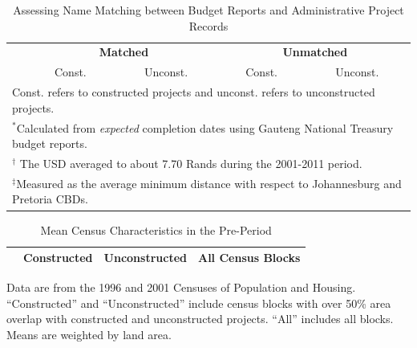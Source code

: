 \documentclass[12pt]{article}
\begin{document}
\vspace{0mm}
\begin{table}[h!]
\centering
\caption{Assessing Name Matching between Budget Reports and Administrative Project Records}\label{table:stringmatch}
\vspace{0mm}
\begin{tabular}{l*{1}{cccc}}
\toprule
  & \multicolumn{2}{c}{\textbf{Matched}}& \multicolumn{2}{c}{\textbf{Unmatched}}    \\
  &Const. & Unconst. &Const. & Unconst.  \\
\midrule

\bottomrule
\multicolumn{5}{l}{\scriptsize Const. refers to constructed projects and unconst. refers to unconstructed projects.}\\[-.5em]
\multicolumn{5}{l}{\scriptsize $^*$Calculated from {\it expected} completion dates using Gauteng National Treasury budget reports.}\\[-.5em]
\multicolumn{5}{l}{\scriptsize $^\dagger$ The USD averaged to about 7.70 Rands during the 2001-2011 period.}\\[-.5em]
\multicolumn{5}{l}{\scriptsize $^\ddagger$Measured as the average minimum distance with respect to Johannesburg and Pretoria CBDs. } \\[-.5em]
\end{tabular}
\end{table} 








\begin{table}[h!]
	\centering
	\caption{Mean Census Characteristics in the Pre-Period}\label{table:projectdescriptivescensus}
\vspace{-2mm}
\begin{threeparttable}
\begin{tabular}{l*{1}{ccc}}
\toprule
& Constructed & Unconstructed & All Census Blocks \\
\midrule
 
\bottomrule
\end{tabular}
\begin{tablenotes}
\item \footnotesize Data are from the 1996 and 2001 Censuses of Population and Housing.
``Constructed'' and ``Unconstructed'' include census blocks with over 50\% 
 area overlap with constructed and unconstructed projects. 
``All''  includes all blocks.  Means are weighted by land area.
\end{tablenotes}
\end{threeparttable}
\end{table}
\end{document}
